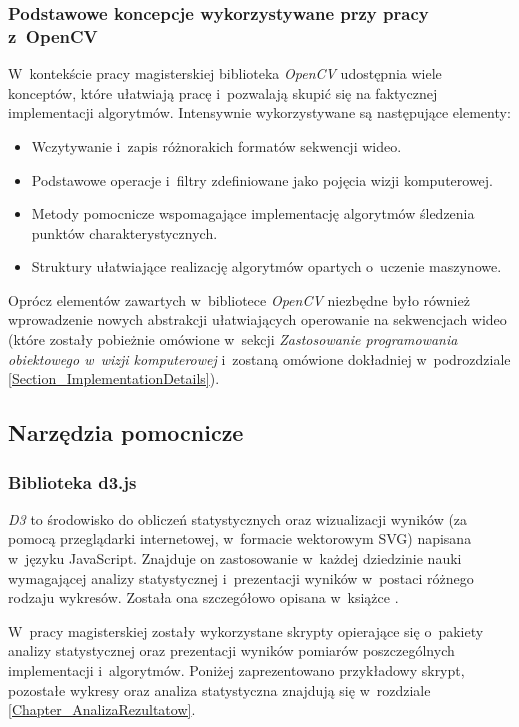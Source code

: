       \subsubsection{Podstawowe koncepcje wykorzystywane przy pracy z~OpenCV}
      W~kontekście pracy magisterskiej biblioteka \textit{OpenCV} udostępnia wiele konceptów, które ułatwiają pracę i~pozwalają skupić się na faktycznej implementacji algorytmów. Intensywnie wykorzystywane są następujące elementy:
      \begin{itemize}
        \item Wczytywanie i~zapis różnorakich formatów sekwencji wideo.
        \item Podstawowe operacje i~filtry zdefiniowane jako pojęcia wizji komputerowej.
        \item Metody pomocnicze wspomagające implementację algorytmów śledzenia punktów charakterystycznych.
        \item Struktury ułatwiające realizację algorytmów opartych o~uczenie maszynowe.
      \end{itemize}

      Oprócz elementów zawartych w~bibliotece \textit{OpenCV} niezbędne było również wprowadzenie nowych abstrakcji ułatwiających operowanie na sekwencjach wideo (które zostały pobieżnie omówione w~sekcji \textit{Zastosowanie programowania obiektowego w~wizji komputerowej} i~zostaną omówione dokładniej w~podrozdziale \ref{Section_ImplementationDetails}).

    \subsection{Narzędzia pomocnicze}\label{Subsection_PomocniczeTechnologie}

      \subsubsection{Biblioteka d3.js}
      \textit{D3} to środowisko do obliczeń statystycznych oraz wizualizacji wyników (za pomocą przeglądarki internetowej, w~formacie wektorowym SVG) napisana w~języku JavaScript. Znajduje on zastosowanie w~każdej dziedzinie nauki wymagającej analizy statystycznej i~prezentacji wyników w~postaci różnego rodzaju wykresów. Została ona szczegółowo opisana w~książce \cite{D3Book}.

      W~pracy magisterskiej zostały wykorzystane skrypty opierające się o~pakiety analizy statystycznej oraz prezentacji wyników pomiarów poszczególnych implementacji i~algorytmów. Poniżej zaprezentowano przykładowy skrypt, pozostałe wykresy oraz analiza statystyczna znajdują się w~rozdziale \ref{Chapter_AnalizaRezultatow}.

